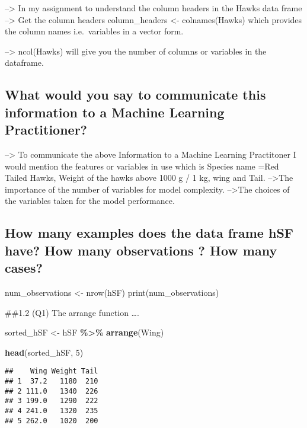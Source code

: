 \documentclass[
]{article}
\newenvironment{Shaded}{\begin{snugshade}}{\end{snugshade}}
\newcommand{\DecValTok}[1]{\textcolor[rgb]{0.00,0.00,0.81}{#1}}
\newcommand{\FunctionTok}[1]{\textcolor[rgb]{0.13,0.29,0.53}{\textbf{#1}}}
\newcommand{\NormalTok}[1]{#1}
\newcommand{\OtherTok}[1]{\textcolor[rgb]{0.56,0.35,0.01}{#1}}
\newcommand{\SpecialCharTok}[1]{\textcolor[rgb]{0.81,0.36,0.00}{\textbf{#1}}}
\begin{document}
--\textgreater{} In my assignment to understand the column headers in
the Hawks data frame --\textgreater{} Get the column headers
column\_headers \textless- colnames(Hawks) which provides the column
names i.e.~variables in a vector form.

--\textgreater{} ncol(Hawks) will give you the number of columns or
variables in the dataframe.

\subsection{What would you say to communicate this information to a
Machine Learning
Practitioner?}\label{what-would-you-say-to-communicate-this-information-to-a-machine-learning-practitioner}

--\textgreater{} To communicate the above Information to a Machine
Learning Practitoner I would mention the features or variables in use
which is Species name =Red Tailed Hawks, Weight of the hawks above 1000
g / 1 kg, wing and Tail. --\textgreater The importance of the number of
variables for model complexity. --\textgreater The choices of the
variables taken for the model performance.

\subsection{How many examples does the data frame hSF have? How many
observations ? How many
cases?}\label{how-many-examples-does-the-data-frame-hsf-have-how-many-observations-how-many-cases}

num\_observations \textless- nrow(hSF) print(num\_observations)

\#\#1.2 (Q1) The arrange function \ldots.

\begin{Shaded}
\begin{Highlighting}[]
\NormalTok{sorted\_hSF }\OtherTok{\textless{}{-}}\NormalTok{ hSF }\SpecialCharTok{\%\textgreater{}\%}
  \FunctionTok{arrange}\NormalTok{(Wing)}

\FunctionTok{head}\NormalTok{(sorted\_hSF, }\DecValTok{5}\NormalTok{)}
\end{Highlighting}
\end{Shaded}

\begin{verbatim}
##    Wing Weight Tail
## 1  37.2   1180  210
## 2 111.0   1340  226
## 3 199.0   1290  222
## 4 241.0   1320  235
## 5 262.0   1020  200
\end{verbatim}
\end{document}

